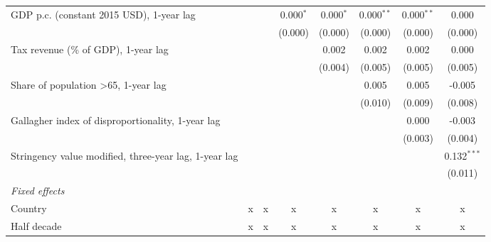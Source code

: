 \begin{table}[htbp]
\begin{tabular}{lccccccc}
      GDP p.c. (constant 2015 USD), 1-year lag                                  &              &              & 0.000$^{*}$  & 0.000$^{*}$  & 0.000$^{**}$ & 0.000$^{**}$ & 0.000\\   
                                                                                &              &              & (0.000)      & (0.000)      & (0.000)      & (0.000)      & (0.000)\\   
      Tax revenue (\% of GDP), 1-year lag                                       &              &              &              & 0.002        & 0.002        & 0.002        & 0.000\\   
                                                                                &              &              &              & (0.004)      & (0.005)      & (0.005)      & (0.005)\\   
      Share of population >65, 1-year lag                                       &              &              &              &              & 0.005        & 0.005        & -0.005\\   
                                                                                &              &              &              &              & (0.010)      & (0.009)      & (0.008)\\   
      Gallagher index of disproportionality, 1-year lag                         &              &              &              &              &              & 0.000        & -0.003\\   
                                                                                &              &              &              &              &              & (0.003)      & (0.004)\\   
      Stringency value modified, three-year lag, 1-year lag                     &              &              &              &              &              &              & 0.132$^{***}$\\   
                                                                                &              &              &              &              &              &              & (0.011)\\   
      \emph{Fixed effects}\\
      Country                                                                   & x            & x            & x            & x            & x            & x            & x\\  
      Half decade                                                               & x            & x            & x            & x            & x            & x            & x\\  

\end{tabular}
\end{table}
